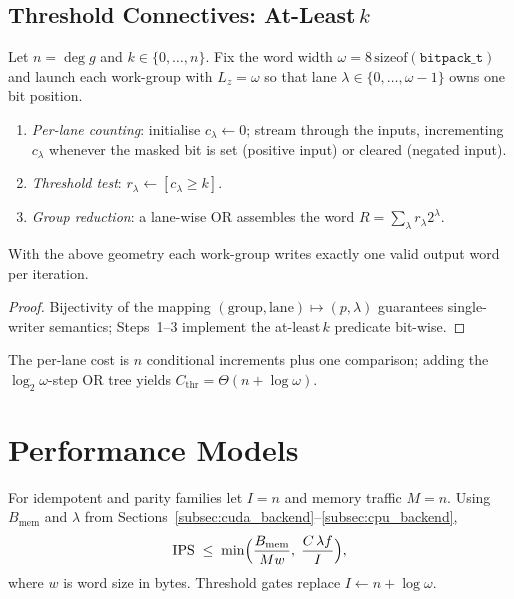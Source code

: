 \subsection{Threshold Connectives: At\hyp{}Least\,$k$}
\label{subsec:threshold_connectives}

Let $n=\deg g$ and $k\in\{0,\dots,n\}$.  Fix the word width
$\omega=8\,\mathrm{sizeof}(\texttt{bitpack\_t})$ and launch each work\hyp{}group
with $L_z=\omega$ so that lane $\lambda\in\{0,\dots,\omega-1\}$ owns one bit
position.
\begin{enumerate}
  \item \emph{Per\hyp{}lane counting}: initialise $c_\lambda\gets0$; stream
        through the inputs, incrementing $c_\lambda$ whenever the masked bit is
        set (positive input) or cleared (negated input).
  \item \emph{Threshold test}: $r_\lambda\gets[c_\lambda\ge k]$.
  \item \emph{Group reduction}: a lane\hyp{}wise OR assembles the word
        $R=\sum_{\lambda} r_\lambda 2^{\lambda}$.
\end{enumerate}

\begin{theorem}
With the above geometry each work\hyp{}group writes exactly one valid output
word per iteration.
\end{theorem}

\begin{proof}
Bijectivity of the mapping $(\text{group},\text{lane})\mapsto(p,\lambda)$
guarantees single\hyp{}writer semantics; Steps~1–3 implement the at\hyp{}least\,$k$
predicate bit\hyp{}wise.
\end{proof}

The per\hyp{}lane cost is $n$ conditional increments plus one comparison;
adding the $\log_2\omega$\hyp{}step OR tree yields
$C_{\text{thr}}=\Theta(n+\log\omega)$.

\section{Performance Models}
\label{sec:gate_performance_models}

For idempotent and parity families let $I=n$ and memory traffic $M=n$.  Using
$B_{\text{mem}}$ and $\lambda$ from
Sections~\ref{subsec:cuda_backend}--\ref{subsec:cpu_backend},
\[
  \text{IPS}\;\le\;\min\Bigl(\frac{B_{\text{mem}}}{M w},\;\frac{C\,\lambda f}{I}\Bigr),
\] where $w$ is word size in bytes.  Threshold gates replace
$I\gets n+\log\omega$.

